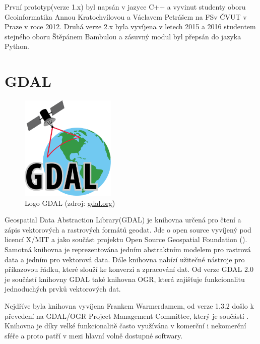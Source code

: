 První prototyp(verze 1.x) byl napsán v jazyce C++ a vyvinut studenty
oboru Geoinformatika Annou Kratochvílovou a Václavem Petrášem na FSv
ČVUT v Praze v roce 2012. Druhá verze 2.x byla vyvíjena v letech 2015
a 2016 studentem stejného oboru Štěpánem Bambulou a zásuvný modul byl
přepsán do jazyka Python. \citep{vfk_qgis_plugin}
 
\section{GDAL}
\label{sec:gdal}
\begin{figure}[H]
	 \centering
      \includegraphics[height=5cm]{./pictures/gdal-logo.png}
      \caption{Logo GDAL (zdroj:
\href{https://upload.wikimedia.org/wikipedia/commons/thumb/d/df/GDALLogoColor.svg/572px-GDALLogoColor.svg.png}{gdal.org})}
      \label{fig:gdal}
  \end{figure}
  
Geospatial Data Abstraction Library(GDAL) je knihovna určená pro čtení
a zápis vektorových a rastrových formátů geodat. Jde o open source
vyvíjený pod licencí X/MIT a jako součást projektu Open Source
Geospatial Foundation (). Samotná knihovna je reprezentována
jedním abstraktním modelem pro rastrová data a jedním pro vektorová
data. Dále knihovna nabízí užitečné nástroje pro příkazovou řádku,
které slouží ke konverzi a zpracování dat. Od verze GDAL 2.0 je
součástí knihovny GDAL také knihovna OGR, která zajišťuje
funkcionalitu jednoduchých prvků vektorových dat.

Nejdříve byla knihovna vyvíjena Frankem Warmerdamem, od verze 1.3.2
došlo k převedení na GDAL/OGR Project Management Committee, který je
součástí . Knihovna je díky velké funkcionalitě často
využívána v komerční i nekomerční sféře a proto patří v  mezi
hlavní volně dostupné softwary. \cite{gdal, gdal_wiki}

